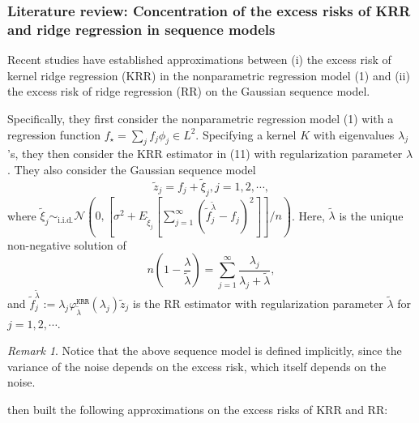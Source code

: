 \documentclass{article}
\theoremstyle{plain}
\theoremstyle{definition}
\theoremstyle{remark}
\newtheorem{remark}[theorem]{Remark}
\newcommand{\calN}{\mathcal{N}}
\newcommand*{\krr}{\mathtt{KRR}}
\newcommand{\green}{\color{green}}
\begin{document}
\begin{appendix}
\subsubsection{Literature review: Concentration of the excess risks of KRR and ridge regression in sequence models}\label{subsec_related_work_sequence_model}

Recent studies \citep{cheng2022dimension, misiakiewicz2024non} have established approximations between 
(i) the excess risk of kernel ridge regression (KRR) in the nonparametric regression model (1) and (ii) the excess risk of ridge regression (RR) on the Gaussian sequence model. 

Specifically, they first consider the nonparametric regression model (1)
    with a regression function $f_{\star} = \sum_j f_j \phi_j \in L^2$.
    Specifying a kernel $K$ with eigenvalues $\lambda_j$'s, they then consider the KRR estimator in (11) with regularization parameter $\lambda$. 
    They also consider the Gaussian sequence model 
    $$
    \tilde{z}_j=f_j+ \tilde{\xi}_j, j=1,2, \cdots, 
    $$
    where $\tilde{\xi}_j \sim_{\text{i.i.d.}} \calN (0, [\sigma^2 + E_{\tilde{\xi}_j}[\sum_{j=1}^{\infty}(\tilde{f}_j^{\tilde{\lambda}} - f_j)^2]] / n)$.
    Here, $\tilde{\lambda}$ is the unique non-negative solution of
\begin{equation}\label{eqn_lambda_star}
    n \left(1-\frac{\lambda}{\tilde{\lambda}}\right) = \sum_{j=1}^{\infty} \frac{\lambda_j}{\lambda_j + \tilde{\lambda}},
\end{equation}
and $\tilde{f}_j^{\tilde{\lambda}} := \lambda_j \varphi_{\tilde{\lambda}}^{\krr}(\lambda_j) \tilde{z}_j$ is the RR estimator with regularization parameter $\tilde{\lambda}$ for $j=1, 2, \cdots$. 

\begin{remark}
    Notice that the above sequence model is defined implicitly, since the variance of the noise depends on the excess risk, which itself depends on the noise.
\end{remark}



\cite{misiakiewicz2024non} then built the following approximations on the excess risks of KRR and RR:


\end{appendix}
\end{document}
